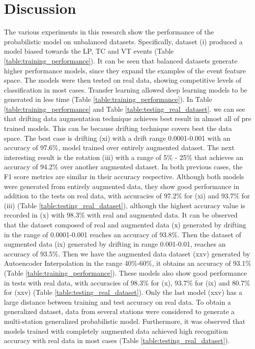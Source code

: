 \documentclass[journal]{IEEEtran}
\begin{document}
\section{Discussion} \label{discussion}
The various experiments in this research show the performance of the probabilistic model on unbalanced datasets. Specifically, dataset (i) produced a model biased towards the LP, TC and VT events (Table \ref{table:training_performance}).
It can be seen that balanced datasets generate higher performance models, since they expand the examples of the event feature space. The models were then tested on real data, showing competitive levels of classification in most cases. Transfer learning allowed deep learning models to be generated in less time (Table \ref{table:training_performance}).
In Table \ref{table:training_performance} and Table \ref{table:testing_real_dataset}. we can see that drifting data augmentation technique achieves best result in almost all of pre trained models. This can be because drifting technique covers best the data space. The best case is drifting (xi) with a drift range 0.0001-0.001 with an accuracy of 97.6\%, model trained over entirely augmented dataset. The next interesting result is the rotation (iii) with a range of 5\% - 25\% that achieves an accuracy of 94.2\% over another augmented dataset. In both previous cases, the F1 score metrics are similar in their accuracy respective. Although both models were generated from entirely augmented data, they show good performance in addition to the tests on real data, with accuracies of 97.2\% for (xi) and 93.7\% for (iii) (Table \ref{table:testing_real_dataset}), although the highest accuracy value is recorded in (x) with 98.3\% with real and augmented data.
It can be observed that the dataset composed of real and augmented data (x) generated by drifting in the range of 0.0001-0.001 reaches an accuracy of 93.8\%. Then the dataset of augmented data (ix) generated by drifting in range 0.001-0.01, reaches an accuracy of 93.5\%. Then we have the augmented data dataset (xxv) generated by Autoencoder Interpolation in the range 40\%-60\%, it obtains an accuracy of 93.1\% (Table \ref{table:training_performance}). These models also show good performance in tests with real data, with accuracies of 98.3\% for (x), 93.7\% for (ix) and 80.7\% for (xxv) (Table \ref{table:testing_real_dataset}). Only the last model (xxv) has a large distance between training and test accuracy on real data.
To obtain a generalized dataset, data from several stations were considered to generate a multi-station generalized probabilistic model. Furthermore, it was observed that models trained with completely augmented data achieved high recognition accuracy with real data in most cases (Table \ref{table:testing_real_dataset}).
\end{document}

